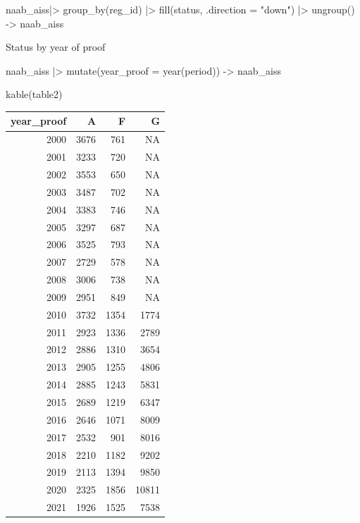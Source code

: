 \documentclass[
]{article}
\newenvironment{Shaded}{\begin{snugshade}}{\end{snugshade}}
\newcommand{\AttributeTok}[1]{\textcolor[rgb]{0.77,0.63,0.00}{#1}}
\newcommand{\FunctionTok}[1]{\textcolor[rgb]{0.00,0.00,0.00}{#1}}
\newcommand{\NormalTok}[1]{#1}
\newcommand{\OtherTok}[1]{\textcolor[rgb]{0.56,0.35,0.01}{#1}}
\newcommand{\SpecialCharTok}[1]{\textcolor[rgb]{0.00,0.00,0.00}{#1}}
\newcommand{\StringTok}[1]{\textcolor[rgb]{0.31,0.60,0.02}{#1}}
\begin{document}
\begin{Shaded}
\begin{Highlighting}[]
\NormalTok{naab\_aiss}\SpecialCharTok{|\textgreater{}} 
  \FunctionTok{group\_by}\NormalTok{(reg\_id) }\SpecialCharTok{|\textgreater{}} 
  \FunctionTok{fill}\NormalTok{(status, }\AttributeTok{.direction =} \StringTok{"down"}\NormalTok{) }\SpecialCharTok{|\textgreater{}}
  \FunctionTok{ungroup}\NormalTok{() }\OtherTok{{-}\textgreater{}}
\NormalTok{  naab\_aiss}
\end{Highlighting}
\end{Shaded}

Status by year of proof

\begin{Shaded}
\begin{Highlighting}[]
\NormalTok{naab\_aiss }\SpecialCharTok{|\textgreater{}}
  \FunctionTok{mutate}\NormalTok{(}\AttributeTok{year\_proof =} \FunctionTok{year}\NormalTok{(period)) }\OtherTok{{-}\textgreater{}}
\NormalTok{  naab\_aiss}
\end{Highlighting}
\end{Shaded}

\begin{Shaded}
\begin{Highlighting}[]
\FunctionTok{kable}\NormalTok{(table2)}
\end{Highlighting}
\end{Shaded}

\begin{longtable}[]{@{}rrrr@{}}
\toprule()
year\_proof & A & F & G \\
\midrule()
\endhead
2000 & 3676 & 761 & NA \\
2001 & 3233 & 720 & NA \\
2002 & 3553 & 650 & NA \\
2003 & 3487 & 702 & NA \\
2004 & 3383 & 746 & NA \\
2005 & 3297 & 687 & NA \\
2006 & 3525 & 793 & NA \\
2007 & 2729 & 578 & NA \\
2008 & 3006 & 738 & NA \\
2009 & 2951 & 849 & NA \\
2010 & 3732 & 1354 & 1774 \\
2011 & 2923 & 1336 & 2789 \\
2012 & 2886 & 1310 & 3654 \\
2013 & 2905 & 1255 & 4806 \\
2014 & 2885 & 1243 & 5831 \\
2015 & 2689 & 1219 & 6347 \\
2016 & 2646 & 1071 & 8009 \\
2017 & 2532 & 901 & 8016 \\
2018 & 2210 & 1182 & 9202 \\
2019 & 2113 & 1394 & 9850 \\
2020 & 2325 & 1856 & 10811 \\
2021 & 1926 & 1525 & 7538 \\
\bottomrule()
\end{longtable}
\end{document}
